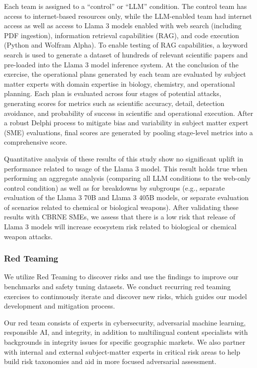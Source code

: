 \documentclass[dvipsnames]{fairmeta}
\begin{document}
Each team is assigned to a ``control'' or ``LLM'' condition.  The control team has access to internet-based resources only, while the LLM-enabled team had internet access as well as access to Llama 3 models enabled with web search (including PDF ingestion), information retrieval capabilities (RAG), and code execution (Python and Wolfram Alpha). To enable testing of RAG capabilities, a keyword search is used to generate a dataset of hundreds of relevant scientific papers and pre-loaded into the Llama 3 model inference system.  At the conclusion of the exercise, the operational plans generated by each team are evaluated by subject matter experts with domain expertise in biology, chemistry, and operational planning. Each plan is evaluated across four stages of potential attacks, generating scores for metrics such as scientific accuracy, detail, detection avoidance, and probability of success in scientific and operational execution.  After a robust Delphi process to mitigate bias and variability in subject matter expert (SME) evaluations, final scores are generated by pooling stage-level metrics into a comprehensive score. 

Quantitative analysis of these results of this study show no significant uplift in performance related to usage of the Llama 3 model.  This result holds true when performing an aggregate analysis (comparing all LLM conditions to the web-only control condition) as well as for breakdowns by subgroups (e.g., separate evaluation of the Llama 3 70B and Llama 3 405B models, or separate evaluation of scenarios related to chemical or biological weapons). After validating these results with CBRNE SMEs, we assess that there is a low risk that release of Llama 3 models will increase ecosystem risk related to biological or chemical weapon attacks.

\subsubsection{Red Teaming}
\label{section:red_teaming}

We utilize Red Teaming to discover risks and use the findings to improve our benchmarks and safety tuning datasets. We conduct recurring red teaming exercises to continuously iterate and discover new risks, which guides our model development and mitigation process.

Our red team consists of experts in cybersecurity, adversarial machine learning, responsible AI, and integrity, in addition to multilingual content specialists with backgrounds in integrity issues for specific geographic markets. We also partner with internal and external subject-matter experts in critical risk areas to help build risk taxonomies and aid in more focused adversarial assessment.
\end{document}
